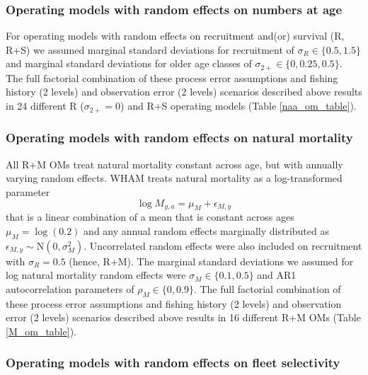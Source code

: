 \documentclass[
  12pt,
]{article}
\begin{document}
\hypertarget{operating-models-with-random-effects-on-numbers-at-age}{%
\subsubsection*{Operating models with random effects on numbers at
age}\label{operating-models-with-random-effects-on-numbers-at-age}}

For operating models with random effects on recruitment and(or) survival
(R, R+S) we assumed marginal standard deviations for recruitment of
\(\sigma_R \in \{0.5,1.5\}\) and marginal standard deviations for older
age classes of \(\sigma_{2+} \in \{0,0.25, 0.5\}\). The full factorial
combination of these process error assumptions and fishing history (2
levels) and observation error (2 levels) scenarios described above
results in 24 different R (\(\sigma_{2+} = 0\)) and R+S operating models
(Table \ref{naa_om_table}).

\hypertarget{operating-models-with-random-effects-on-natural-mortality}{%
\subsubsection*{Operating models with random effects on natural
mortality}\label{operating-models-with-random-effects-on-natural-mortality}}

All R+M OMs treat natural mortality constant across age, but with
annually varying random effects. WHAM treats natural mortality as a
log-transformed parameter \[
\log M_{y,a} = \mu_{M} + \epsilon_{M,y}
\] that is a linear combination of a mean that is constant across ages
\(\mu_{M} = \log(0.2)\) and any annual random effects marginally
distributed as
\(\epsilon_{M,y} \sim \text{N}\left(0,\sigma_M^2\right)\). Uncorrelated
random effects were also included on recruitment with \(\sigma_R = 0.5\)
(hence, R+M). The marginal standard deviations we assumed for log
natural mortality random effects were \(\sigma_M \in \{0.1, 0.5\}\) and
AR1 autocorrelation parameters of \(\rho_M \in \{0,0.9\}\). The full
factorial combination of these process error assumptions and fishing
history (2 levels) and observation error (2 levels) scenarios described
above results in 16 different R+M OMs (Table \ref{M_om_table}).

\hypertarget{operating-models-with-random-effects-on-fleet-selectivity}{%
\subsubsection*{Operating models with random effects on fleet
selectivity}\label{operating-models-with-random-effects-on-fleet-selectivity}}
\end{document}
